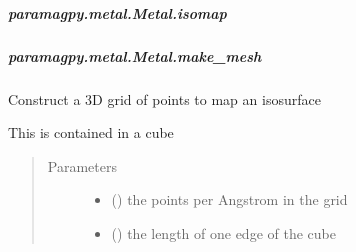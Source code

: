 \documentclass[a4paper,10pt,english,openany,oneside]{sphinxmanual}
\begin{document}
\begin{fulllineitems}
\begin{fulllineitems}
\begin{fulllineitems}
\end{fulllineitems}



\subparagraph{paramagpy.metal.Metal.isomap}
\label{\detokenize{reference/generated/paramagpy.metal.Metal.isomap:paramagpy-metal-metal-isomap}}\label{\detokenize{reference/generated/paramagpy.metal.Metal.isomap::doc}}

\begin{fulllineitems}
\label{\detokenize{reference/generated/paramagpy.metal.Metal.isomap:paramagpy.metal.Metal.isomap}}
\end{fulllineitems}



\subparagraph{paramagpy.metal.Metal.make\_mesh}
\label{\detokenize{reference/generated/paramagpy.metal.Metal.make_mesh:paramagpy-metal-metal-make-mesh}}\label{\detokenize{reference/generated/paramagpy.metal.Metal.make_mesh::doc}}

\begin{fulllineitems}
\label{\detokenize{reference/generated/paramagpy.metal.Metal.make_mesh:paramagpy.metal.Metal.make_mesh}}
Construct a 3D grid of points to map an isosurface

This is contained in a cube
\begin{quote}\begin{description}
\item[{Parameters}] \leavevmode\begin{itemize}
\item {} 
 (\sphinxstyleliteralemphasis{\sphinxupquote{ (}}\sphinxstyleliteralemphasis{\sphinxupquote{)}}) \textendash{} the points per Angstrom in the grid

\item {} 
 (\sphinxstyleliteralemphasis{\sphinxupquote{ (}}\sphinxstyleliteralemphasis{\sphinxupquote{)}}) \textendash{} the length of one edge of the cube


\end{itemize}
\end{description}
\end{quote}
\end{fulllineitems}
\end{fulllineitems}
\end{fulllineitems}
\end{document}
